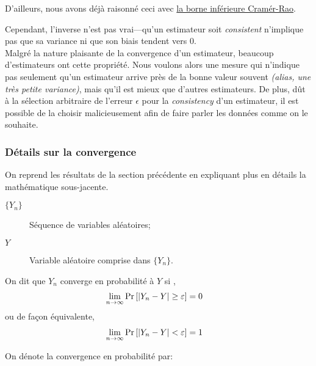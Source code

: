 \documentclass[10pt, french]{article}
\begin{document}
\begin{multicols*}{2}
D'ailleurs, nous avons déjà raisonné ceci avec \hyperlink{cramer-rao}{la borne inférieure Cramér-Rao}.

Cependant, l'inverse n'est pas vrai---qu'un estimateur soit \og \textit{consistent} \fg{} n'implique pas que sa variance ni que son biais tendent vers 0.\\

Malgré la nature plaisante de la convergence d'un estimateur, beaucoup d'estimateurs ont cette propriété. 
Nous voulons alors une mesure qui n'indique pas seulement qu'un estimateur arrive près de la bonne valeur souvent \textit{(alias, une très petite variance)}, mais qu'il est mieux que d'autres estimateurs.
De plus, dût à la sélection arbitraire de l'erreur $\epsilon$ pour la \textit{consistency} d'un estimateur, il est possible de la choisir malicieusement afin de faire parler les données comme on le souhaite. 

\subsubsection*{Détails sur la convergence}
On reprend les résultats de la section précédente en expliquant plus en détails la mathématique sous-jacente.\\

\begin{definitionNOHFILLsub}
\begin{distributions}[Notation]
\begin{description}
	\item[$\{Y_{n}\}$]	Séquence de variables aléatoires;
	\item[$Y$]	Variable aléatoire comprise dans $\{Y_{n}\}$.
\end{description}
\end{distributions}

On dit que $Y_{n}$ converge en probabilité à $Y$ si , 
\begin{align*}
	\underset{n \rightarrow \infty}{\lim} \Pr\left[|Y_{n}	-	Y|	\geq	\varepsilon\right]	
	&=	0
\end{align*}
ou de façon équivalente,
\begin{align*}
	\underset{n \rightarrow \infty}{\lim} \Pr\left[|Y_{n}	-	Y|<	\varepsilon\right]	
	&=	1
\end{align*}

On dénote la convergence en probabilité par: 
\end{definitionNOHFILLsub}


\end{multicols*}
\end{document}
